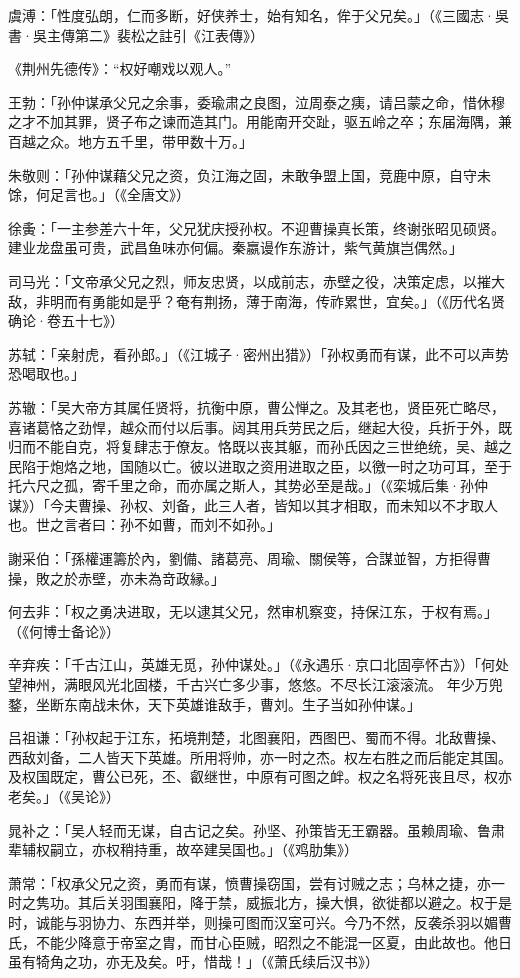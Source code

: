 虞溥：「性度弘朗，仁而多断，好侠养士，始有知名，侔于父兄矣。」（《三國志·吳書·吳主傳第二》裴松之註引《江表傳》）

《荆州先德传》：“权好嘲戏以观人。”

王勃：「孙仲谋承父兄之余事，委瑜肃之良图，泣周泰之痍，请吕蒙之命，惜休穆之才不加其罪，贤子布之谏而造其门。用能南开交趾，驱五岭之卒；东届海隅，兼百越之众。地方五千里，带甲数十万。」

朱敬则：「孙仲谋藉父兄之资，负江海之固，未敢争盟上国，竞鹿中原，自守未馀，何足言也。」（《全唐文》）

徐夤：「一主参差六十年，父兄犹庆授孙权。不迎曹操真长策，终谢张昭见硕贤。建业龙盘虽可贵，武昌鱼味亦何偏。秦嬴谩作东游计，紫气黄旗岂偶然。」

司马光：「文帝承父兄之烈，师友忠贤，以成前志，赤壁之役，决策定虑，以摧大敌，非明而有勇能如是乎？奄有荆扬，薄于南海，传祚累世，宜矣。」（《历代名贤确论·卷五十七》）

苏轼：「亲射虎，看孙郎。」（《江城子·密州出猎》）「孙权勇而有谋，此不可以声势恐喝取也。」

苏辙：「吴大帝方其属任贤将，抗衡中原，曹公惮之。及其老也，贤臣死亡略尽，喜诸葛恪之劲悍，越众而付以后事。闼其用兵劳民之后，继起大役，兵折于外，既归而不能自克，将复肆志于僚友。恪既以丧其躯，而孙氏因之三世绝统，吴、越之民陷于炮烙之地，国随以亡。彼以进取之资用进取之臣，以徼一时之功可耳，至于托六尺之孤，寄千里之命，而亦属之斯人，其势必至是哉。」（《栾城后集·孙仲谋》）「今夫曹操、孙权、刘备，此三人者，皆知以其才相取，而未知以不才取人也。世之言者曰：孙不如曹，而刘不如孙。」

謝采伯：「孫權運籌於內，劉備、諸葛亮、周瑜、關侯等，合謀並智，方拒得曹操，敗之於赤壁，亦未為竒政縁。」

何去非：「权之勇决进取，无以逮其父兄，然审机察变，持保江东，于权有焉。」（《何博士备论》）

辛弃疾：「千古江山，英雄无觅，孙仲谋处。」（《永遇乐·京口北固亭怀古》）「何处望神州，满眼风光北固楼，千古兴亡多少事，悠悠。不尽长江滚滚流。 年少万兜鍪，坐断东南战未休，天下英雄谁敌手，曹刘。生子当如孙仲谋。」

吕祖谦：「孙权起于江东，拓境荆楚，北图襄阳，西图巴、蜀而不得。北敌曹操、西敌刘备，二人皆天下英雄。所用将帅，亦一时之杰。权左右胜之而后能定其国。及权国既定，曹公已死，丕、叡继世，中原有可图之衅。权之名将死丧且尽，权亦老矣。」（《吴论》）

晁补之：「吴人轻而无谋，自古记之矣。孙坚、孙策皆无王霸器。虽赖周瑜、鲁肃辈辅权嗣立，亦权稍持重，故卒建吴国也。」（《鸡肋集》）

萧常：「权承父兄之资，勇而有谋，愤曹操窃国，尝有讨贼之志；乌林之捷，亦一时之隽功。其后关羽围襄阳，降于禁，威振北方，操大惧，欲徙都以避之。权于是时，诚能与羽协力、东西并举，则操可图而汉室可兴。今乃不然，反袭杀羽以媚曹氏，不能少降意于帝室之胄，而甘心臣贼，昭烈之不能混一区夏，由此故也。他日虽有犄角之功，亦无及矣。吁，惜哉！」（《萧氏续后汉书》）

